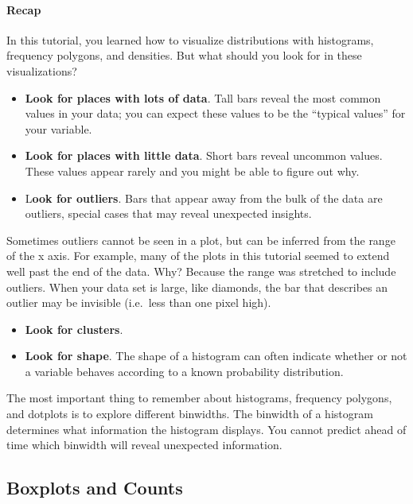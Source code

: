 \documentclass[
]{article}
\begin{document}
\hypertarget{recap-5}{%
\paragraph{Recap}\label{recap-5}}

In this tutorial, you learned how to visualize distributions with
histograms, frequency polygons, and densities. But what should you look
for in these visualizations?

\begin{itemize}
\item
  \textbf{Look for places with lots of data}. Tall bars reveal the most
  common values in your data; you can expect these values to be the
  ``typical values'' for your variable.
\item
  \textbf{Look for places with little data}. Short bars reveal uncommon
  values. These values appear rarely and you might be able to figure out
  why.
\item
  L\textbf{ook for outliers}. Bars that appear away from the bulk of the
  data are outliers, special cases that may reveal unexpected insights.
\end{itemize}

Sometimes outliers cannot be seen in a plot, but can be inferred from
the range of the x axis. For example, many of the plots in this tutorial
seemed to extend well past the end of the data. Why? Because the range
was stretched to include outliers. When your data set is large, like
diamonds, the bar that describes an outlier may be invisible (i.e.~less
than one pixel high).

\begin{itemize}
\item
  \textbf{Look for clusters}.
\item
  \textbf{Look for shape}. The shape of a histogram can often indicate
  whether or not a variable behaves according to a known probability
  distribution.
\end{itemize}

The most important thing to remember about histograms, frequency
polygons, and dotplots is to explore different binwidths. The binwidth
of a histogram determines what information the histogram displays. You
cannot predict ahead of time which binwidth will reveal unexpected
information.

\hypertarget{boxplots-and-counts}{%
\subsection{Boxplots and Counts}\label{boxplots-and-counts}}
\end{document}
